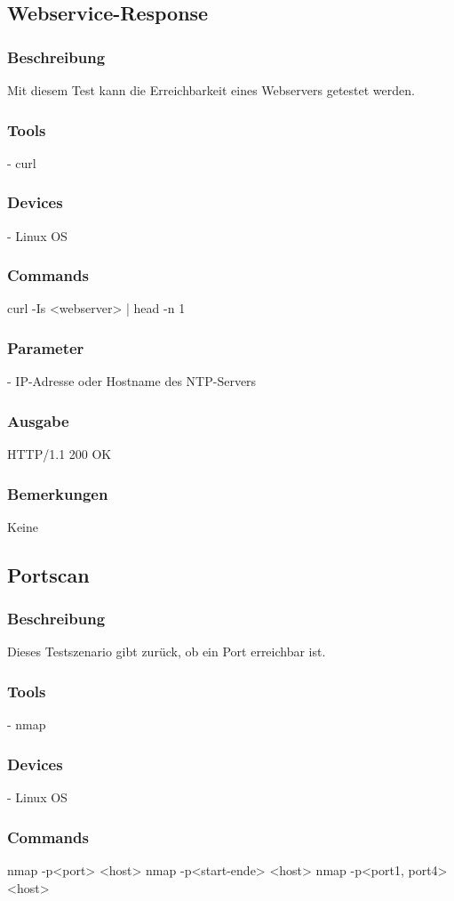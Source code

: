 \documentclass[a4,12pt]{scrartcl}
\begin{document}
\subsection{Webservice-Response}
\subsubsection{Beschreibung}
Mit diesem Test kann die Erreichbarkeit eines Webservers getestet werden.
\subsubsection{Tools}
- curl
\subsubsection{Devices}
- Linux OS
\subsubsection{Commands}
curl -Is <webserver> | head -n 1
\subsubsection{Parameter}
- IP-Adresse oder Hostname des NTP-Servers
\subsubsection{Ausgabe}
HTTP/1.1 200 OK
\subsubsection{Bemerkungen}
Keine

\subsection{Portscan}
\subsubsection{Beschreibung}
Dieses Testszenario gibt zurück, ob ein Port erreichbar ist.
\subsubsection{Tools}
- nmap
\subsubsection{Devices}
- Linux OS
\subsubsection{Commands}
nmap -p<port> <host>\newline
nmap -p<start-ende> <host>\newline
nmap -p<port1, port4> <host>\newline
\end{document}
